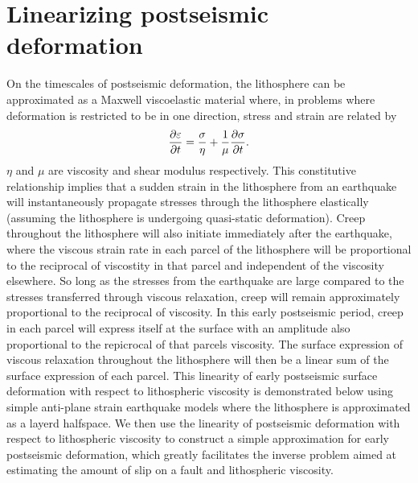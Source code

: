 \documentclass[12pt]{article}
\begin{document}
\section{Linearizing postseismic deformation} 
On the timescales of postseismic deformation, the lithosphere can be
approximated as a Maxwell viscoelastic material where, in problems
where deformation is restricted to be in one direction, stress and
strain are related by
\begin{equation}
  \frac{\partial\bold{\varepsilon}}{\partial t}=\frac{\bold{\sigma}}{\eta} + 
                              \frac{1}{\mu}\frac{\partial\bold{\sigma}}{\partial t}.
\end{equation}
$\eta$ and $\mu$ are viscosity and shear modulus respectively.  This
constitutive relationship implies that a sudden strain in the
lithosphere from an earthquake will instantaneously propagate stresses
through the lithosphere elastically (assuming the lithosphere is
undergoing quasi-static deformation).  Creep throughout the
lithosphere will also initiate immediately after the earthquake, where
the viscous strain rate in each parcel of the lithosphere will be
proportional to the reciprocal of viscostity in that parcel and
independent of the viscosity elsewhere.  So long as the stresses from
the earthquake are large compared to the stresses transferred through
viscous relaxation, creep will remain approximately proportional to
the reciprocal of viscosity.  In this early postseismic period, creep
in each parcel will express itself at the surface with an amplitude
also proportional to the repicrocal of that parcels viscosity.  The
surface expression of viscous relaxation throughout the lithosphere
will then be a linear sum of the surface expression of each parcel.
This linearity of early postseismic surface deformation with respect
to lithospheric viscosity is demonstrated below using simple
anti-plane strain earthquake models where the lithosphere is
approximated as a layerd halfspace.  We then use the linearity of
postseismic deformation with respect to lithospheric viscosity to
construct a simple approximation for early postseismic deformation,
which greatly facilitates the inverse problem aimed at estimating the
amount of slip on a fault and lithospheric viscosity.
\end{document}
